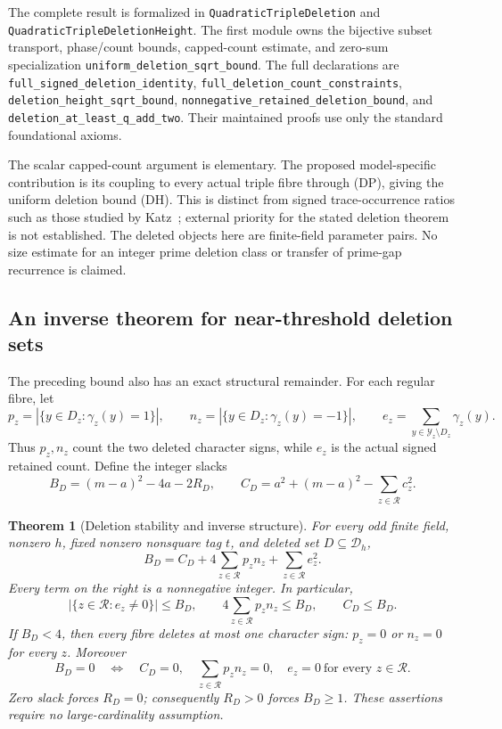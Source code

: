 \documentclass[11pt]{article}
\newtheorem{theorem}{Theorem}[section]
\begin{document}
The complete result is formalized in
\texttt{QuadraticTripleDeletion} and
\texttt{QuadraticTripleDeletionHeight}.
The first module owns the bijective subset transport, phase/count
bounds, capped-count estimate, and zero-sum specialization
\texttt{uniform\_deletion\_sqrt\_bound}.
The full declarations are
\texttt{full\_signed\_deletion\_identity},
\texttt{full\_deletion\_count\_constraints},
\texttt{deletion\_height\_sqrt\_bound},
\texttt{nonnegative\_retained\_deletion\_bound}, and
\texttt{deletion\_at\_least\_q\_add\_two}.
Their maintained proofs use only the standard foundational axioms.

The scalar capped-count argument is elementary. The proposed
model-specific contribution is its coupling to every actual triple
fibre through (DP), giving the uniform deletion bound (DH).
This is distinct from signed trace-occurrence ratios such as
those studied by Katz~\cite{KatzTraceRatios}; external priority
for the stated deletion theorem is not established.
The deleted objects here are finite-field parameter pairs.
No size estimate for an integer prime deletion class or transfer
of prime-gap recurrence is claimed.

\subsection{An inverse theorem for near-threshold deletion sets}
The preceding bound also has an exact structural remainder.
For each regular fibre, let
\[
 p_z=|\{y\in D_z:\gamma_z(y)=1\}|,\qquad
 n_z=|\{y\in D_z:\gamma_z(y)=-1\}|,\qquad
 e_z=\sum_{y\in\mathcal Y_z\setminus D_z}\gamma_z(y).
\]
Thus \(p_z,n_z\) count the two deleted character signs, while \(e_z\)
is the actual signed retained count. Define the integer slacks
\[
 B_D=(m-a)^2-4a-2R_D,\qquad
 C_D=a^2+(m-a)^2-\sum_{z\in\mathcal R}c_z^2.
\]

\begin{theorem}[Deletion stability and inverse structure]
\label{thm:tripleDeletionStability}
For every odd finite field, nonzero \(h\), fixed nonzero nonsquare
tag \(t\), and deleted set \(D\subseteq\mathcal D_h\),
\[
 \boxed{\quad
 B_D=C_D+4\sum_{z\in\mathcal R}p_zn_z+
                   \sum_{z\in\mathcal R}e_z^2 .
 \quad} \tag{SC}
\]
Every term on the right is a nonnegative integer. In particular,
\[
 |\{z\in\mathcal R:e_z\ne0\}|\le B_D,\qquad
 4\sum_{z\in\mathcal R}p_zn_z\le B_D,\qquad C_D\le B_D.
\]
If \(B_D<4\), then every fibre deletes at most one character sign:
\(p_z=0\) or \(n_z=0\) for every \(z\).
Moreover
\[
 B_D=0
 \quad\Longleftrightarrow\quad
 C_D=0,\quad \sum_{z\in\mathcal R}p_zn_z=0,\quad
 e_z=0\ \text{for every }z\in\mathcal R.
\]
Zero slack forces \(R_D=0\); consequently \(R_D>0\) forces \(B_D\ge1\).
These assertions require no large-cardinality assumption.
\end{theorem}
\end{document}
